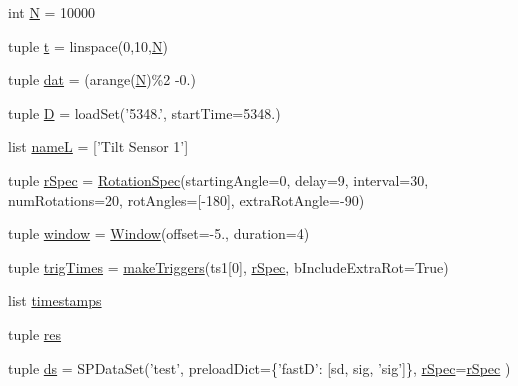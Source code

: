 \begin{DoxyCompactItemize}
\item 
int \hyperlink{namespacerepo_1_1programs_1_1pythonpackages_1_1pr_1_1SPfuncs_aaea13a6ab57b30bea3669d56fd489e30}{N} = 10000
\item 
tuple \hyperlink{namespacerepo_1_1programs_1_1pythonpackages_1_1pr_1_1SPfuncs_ae6715e84e2c13a885096710a851aba3a}{t} = linspace(0,10,\hyperlink{namespacerepo_1_1programs_1_1pythonpackages_1_1pr_1_1SPfuncs_aaea13a6ab57b30bea3669d56fd489e30}{N})
\item 
tuple \hyperlink{namespacerepo_1_1programs_1_1pythonpackages_1_1pr_1_1SPfuncs_a68243cfba6d3074cf6381b76546eec71}{dat} = (arange(\hyperlink{namespacerepo_1_1programs_1_1pythonpackages_1_1pr_1_1SPfuncs_aaea13a6ab57b30bea3669d56fd489e30}{N})\%2 -\/0.)
\item 
tuple \hyperlink{namespacerepo_1_1programs_1_1pythonpackages_1_1pr_1_1SPfuncs_ae11ccbd488015737fccc78456a5a112f}{D} = load\-Set('5348.', start\-Time=5348.)
\item 
list \hyperlink{namespacerepo_1_1programs_1_1pythonpackages_1_1pr_1_1SPfuncs_a7fe775d9cf2e94f97127d699a8b92579}{name\-L} = \mbox{[}'Tilt Sensor 1'\mbox{]}
\item 
tuple \hyperlink{namespacerepo_1_1programs_1_1pythonpackages_1_1pr_1_1SPfuncs_a0fa8a32d68b3b6a1486926b952bd3676}{r\-Spec} = \hyperlink{namespacerepo_1_1programs_1_1pythonpackages_1_1pr_1_1SPfuncs_abeb96363789885a36812850590fbfbab}{Rotation\-Spec}(starting\-Angle=0, delay=9, interval=30, num\-Rotations=20, rot\-Angles=\mbox{[}-\/180\mbox{]}, extra\-Rot\-Angle=-\/90)
\item 
tuple \hyperlink{namespacerepo_1_1programs_1_1pythonpackages_1_1pr_1_1SPfuncs_a4dc94cbb119a397cfee47da5a4681676}{window} = \hyperlink{namespacerepo_1_1programs_1_1pythonpackages_1_1pr_1_1SPfuncs_a5f881c246a0ac49955b33746df6c379b}{Window}(offset=-\/5., duration=4)
\item 
tuple \hyperlink{namespacerepo_1_1programs_1_1pythonpackages_1_1pr_1_1SPfuncs_a165fa263d040e95cba983de350ee563f}{trig\-Times} = \hyperlink{namespacerepo_1_1programs_1_1pythonpackages_1_1pr_1_1SPfuncs_af8a48b74a6d4e725e2409329126076a6}{make\-Triggers}(ts1\mbox{[}0\mbox{]}, \hyperlink{namespacerepo_1_1programs_1_1pythonpackages_1_1pr_1_1SPfuncs_a0fa8a32d68b3b6a1486926b952bd3676}{r\-Spec}, b\-Include\-Extra\-Rot=True)
\item 
list \hyperlink{namespacerepo_1_1programs_1_1pythonpackages_1_1pr_1_1SPfuncs_ab1cf4f0f232b2ccd32f08baa27263f1b}{timestamps}
\item 
tuple \hyperlink{namespacerepo_1_1programs_1_1pythonpackages_1_1pr_1_1SPfuncs_ab8ea55b3a0adfc5e8090a9a40db96e5a}{res}
\item 
tuple \hyperlink{namespacerepo_1_1programs_1_1pythonpackages_1_1pr_1_1SPfuncs_a5e62fc21df71cfdd96a1c0048b264295}{ds} = S\-P\-Data\-Set('test', preload\-Dict=\{'fast\-D'\-: \mbox{[}sd, sig, 'sig'\mbox{]}\}, \hyperlink{namespacerepo_1_1programs_1_1pythonpackages_1_1pr_1_1SPfuncs_a0fa8a32d68b3b6a1486926b952bd3676}{r\-Spec}=\hyperlink{namespacerepo_1_1programs_1_1pythonpackages_1_1pr_1_1SPfuncs_a0fa8a32d68b3b6a1486926b952bd3676}{r\-Spec} )
\end{DoxyCompactItemize}


